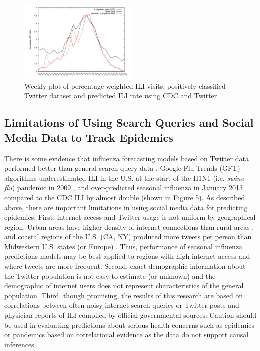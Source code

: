 \documentclass[sigconf]{acmart}
\begin{document}
\begin{figure}
  \centering
  \includegraphics[width=0.5\textwidth]{images/Figure4.pdf}
  \caption{Weekly plot of percentage weighted ILI visits, positively classified Twitter
  dataset and predicted ILI rate using CDC and Twitter \cite{achrekar12}} 
  \label{fig:Figure4} 
\end{figure}


\subsection{Limitations of Using Search Queries and Social Media Data to Track Epidemics}

There is some evidence that influenza forecasting models based on Twitter data performed 
better than general search query data \cite{paul14}. Google Flu Trends (GFT) algorithms 
underestimated ILI in the U.S. at the start of the H1N1 (i.e. {\it swine flu}) pandemic 
in 2009 \cite{butler13}, and over-predicted seasonal influenza in January 2013 compared 
to the CDC ILI by almost double \cite{lazer14} (shown in Figure 5). As described above, 
there are important limitations in using social media data for predicting epidemics: 
First, internet access and Twitter usage is not uniform by geographical region. Urban areas 
have higher density of internet connections than rural areas \cite{yuan13}, and coastal 
regions of the U.S. (CA, NY) produced more tweets per person than Midwestern U.S. states 
(or Europe) \cite{achrekar12}. Thus, performance of seasonal influenza predictions models 
may be best applied to regions with high internet access and where tweets are more frequent. 
Second, exact demographic information about the Twitter population is not easy to estimate 
(or unknown) and the demographic of internet users does not represent characteristics of 
the general population.  Third, though promising, the results of this research are based 
on correlations between often noisy internet search queries or Twitter posts and physician 
reports of ILI compiled by official governmental sources. Caution should be  used in 
evaluating predictions about serious health concerns such as epidemics or pandemics 
based on correlational evidence as the data do not support causal inferences. 
\end{document}
